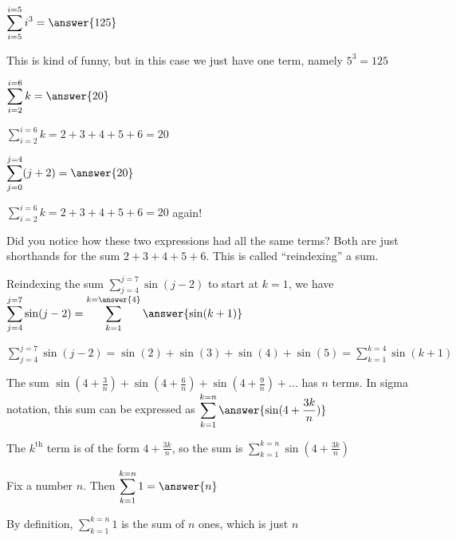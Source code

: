 \documentclass{ximera}
\begin{document}
\begin{question}
	$\displaystyle\sum_{i=5}^{i=5} i^3 = \answer{125}$
	\begin{hint}
		This is kind of funny, but in this case we just have one term, namely $5^3 = 125$
	\end{hint}
\end{question}

\begin{question}

	$\displaystyle\sum_{i=2}^{i=6} k = \answer{20}$

	 \begin{hint}
	 	$\displaystyle\sum_{i=2}^{i=6} k = 2+3+4+5+6 = 20$
	 \end{hint}
	
	$\displaystyle\sum_{j=0}^{j=4} (j+2) = \answer{20}$
	 \begin{hint}
	 	$\displaystyle\sum_{i=2}^{i=6} k = 2+3+4+5+6 = 20$ again!
	 \end{hint}
	
	\begin{feedback}
Did you notice how these two expressions had all the same terms?  Both are just shorthands for the sum $2+3+4+5+6$.  This is called ``reindexing'' a sum.
	\end{feedback}
\end{question}

\begin{question}
	Reindexing the sum $\displaystyle\sum_{j=4}^{j=7} \sin(j-2)$ to start at $k=1$, we have $\displaystyle\sum_{j=4}^{j=7} \sin(j-2) = \displaystyle\sum_{k=1}^{k=\answer{4}} \answer{\sin(k+1)}$
		\begin{hint}
			$\displaystyle\sum_{j=4}^{j=7} \sin(j-2) = \sin(2)+\sin(3) + \sin(4)+\sin(5) = \displaystyle\sum_{k=1}^{k=4} \sin(k+1)$
		\end{hint}
\end{question}

\begin{question}
	The sum $\sin(4+\frac{3}{n}) + \sin(4+\frac{6}{n})+\sin(4+\frac{9}{n})+...$ has $n$ terms. In sigma notation, this sum can be expressed as $\displaystyle\sum_{k=1}^{k=n} \answer{ \sin(4+\frac{3k}{n})}$
		\begin{hint}
			The $k^{\textrm{th}}$ term is of the form $4+\frac{3k}{n}$, so the sum is $\displaystyle\sum_{k=1}^{k=n} \sin(4+\frac{3k}{n})$
		\end{hint}
\end{question}

\begin{question}
	Fix a number $n$.  Then $\displaystyle\sum_{k=1}^{k=n} 1 = \answer{n}$
	 \begin{hint}
	 	By definition, $\displaystyle\sum_{k=1}^{k=n} 1$ is the sum of $n$ ones, which is just $n$
	 \end{hint}
\end{question}
\end{document}

